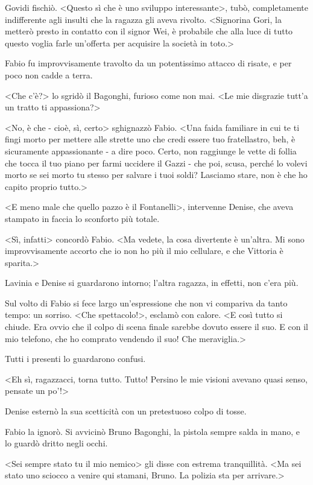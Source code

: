Govidi fischiò. <Questo sì che è uno sviluppo interessante>, tubò, completamente indifferente agli insulti che la ragazza gli aveva rivolto. <Signorina Gori, la metterò presto in contatto con il signor Wei, è probabile che alla luce di tutto questo voglia farle un'offerta per acquisire la società in toto.>

Fabio fu improvvisamente travolto da un potentissimo attacco di risate, e per poco non cadde a terra.

<Che c'è?> lo sgridò il Bagonghi, furioso come non mai. <Le mie disgrazie tutt'a un tratto ti appassiona?>

<No, è che - cioè, sì, certo> sghignazzò Fabio. <Una faida familiare in cui te ti fingi morto per mettere alle strette uno che credi essere tuo fratellastro, beh, è sicuramente appassionante - a dire poco. Certo, non raggiunge le vette di follia che tocca il tuo piano per farmi uccidere il Gazzi - che poi, scusa, perché lo volevi morto se sei morto tu stesso per salvare i tuoi soldi? Lasciamo stare, non è che ho capito proprio tutto.>

<E meno male che quello pazzo è il Fontanelli>, intervenne Denise, che aveva stampato in faccia lo sconforto più totale.

<Sì, infatti> concordò Fabio. <Ma vedete, la cosa divertente è un'altra. Mi sono improvvisamente accorto che io non ho più il mio cellulare, e che Vittoria è sparita.>

Lavinia e Denise si guardarono intorno; l'altra ragazza, in effetti, non c'era più.

Sul volto di Fabio si fece largo un'espressione che non vi compariva da tanto tempo: un sorriso. <Che spettacolo!>, esclamò con calore. <E così tutto si chiude. Era ovvio che il colpo di scena finale sarebbe dovuto essere il suo. E con il mio telefono, che ho comprato vendendo il suo! Che meraviglia.>

Tutti i presenti lo guardarono confusi.

<Eh sì, ragazzacci, torna tutto. Tutto! Persino le mie visioni avevano quasi senso, pensate un po'!>

Denise esternò la sua scetticità con un pretestuoso colpo di tosse.

Fabio la ignorò. Si avvicinò Bruno Bagonghi, la pistola sempre salda in mano, e lo guardò dritto negli occhi.

<Sei sempre stato tu il mio nemico> gli disse con estrema tranquillità. <Ma sei stato uno sciocco a venire qui stamani, Bruno. La polizia sta per arrivare.>
